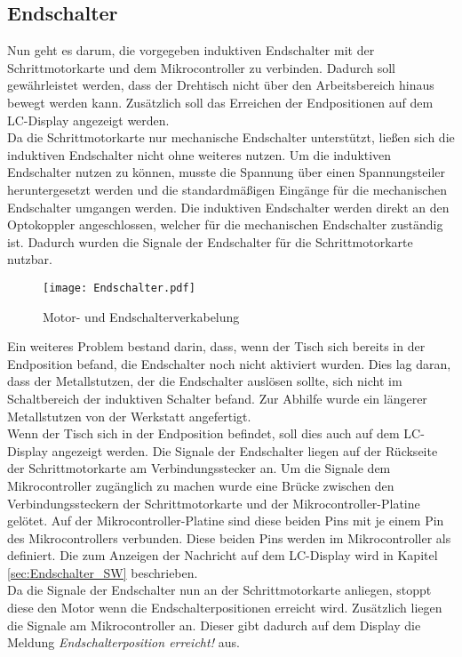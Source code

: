 \subsection{Endschalter}
Nun geht es darum, die vorgegeben induktiven Endschalter mit der Schrittmotorkarte und dem Mikrocontroller zu verbinden. Dadurch soll gewährleistet werden, dass der Drehtisch nicht über den Arbeitsbereich hinaus bewegt werden kann. Zusätzlich soll das Erreichen der Endpositionen auf dem LC-Display angezeigt werden.\\
Da die Schrittmotorkarte nur mechanische Endschalter unterstützt, ließen sich die induktiven Endschalter nicht ohne weiteres nutzen. Um die induktiven Endschalter nutzen zu können, musste die Spannung über einen Spannungsteiler heruntergesetzt werden und die standardmäßigen Eingänge für die mechanischen Endschalter umgangen werden. Die induktiven Endschalter werden direkt an den Optokoppler angeschlossen, welcher für die mechanischen Endschalter zuständig ist. Dadurch wurden die Signale der Endschalter für die Schrittmotorkarte nutzbar.\\
\begin{figure}[h]
\centering
\texttt{[image: Endschalter.pdf]}
\caption{Motor- und Endschalterverkabelung}
\label{fig:Motorverkabelung}
\end{figure}
Ein weiteres Problem bestand darin, dass, wenn der Tisch sich bereits in der Endposition befand, die Endschalter noch nicht aktiviert wurden. Dies lag daran, dass der Metallstutzen, der die Endschalter auslösen sollte, sich nicht im Schaltbereich der induktiven Schalter befand. Zur Abhilfe wurde ein längerer Metallstutzen von der Werkstatt angefertigt.\\
Wenn der Tisch sich in der Endposition befindet, soll dies auch auf dem LC-Display angezeigt werden. Die Signale der Endschalter liegen auf der Rückseite der Schrittmotorkarte am Verbindungsstecker an. Um die Signale dem Mikrocontroller zugänglich zu machen wurde eine Brücke zwischen den Verbindungssteckern der Schrittmotorkarte und der Mikrocontroller-Platine gelötet. Auf der Mikrocontroller-Platine sind diese beiden Pins mit je einem Pin des Mikrocontrollers verbunden. Diese beiden Pins werden im Mikrocontroller als  definiert. Die  zum Anzeigen der Nachricht auf dem LC-Display wird in Kapitel \ref{sec:Endschalter_SW} beschrieben.\\
Da die Signale der Endschalter nun an der Schrittmotorkarte anliegen, stoppt diese den Motor wenn die Endschalterpositionen erreicht wird. Zusätzlich liegen die Signale am Mikrocontroller an. Dieser gibt dadurch auf dem Display die Meldung \emph{Endschalterposition erreicht!} aus.

